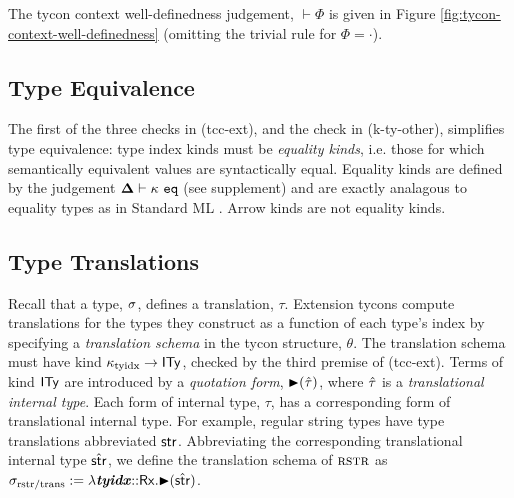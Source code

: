 \documentclass[preprint]{sigplanconf}
\begin{document}
\noindent The tycon context well-definedness judgement, $\vdash \Phi$ is given in Figure \ref{fig:tycon-context-well-definedness} (omitting the trivial rule for $\Phi=\cdot$). 



\subsection{Type Equivalence}\label{sec:type-equivalence}
\noindent The first of the three checks in (tcc-ext), and the check in (k-ty-other),  simplifies type equivalence: type index kinds must be \emph{equality kinds}, i.e. those for which semantically equivalent values are syntactically equal. Equality kinds are defined by the judgement $\boldsymbol\Delta \vdash \kappa~\mathtt{eq}$ (see supplement) and are exactly analagous to equality types as in Standard ML \cite{Tofte:89:TheDefinitionOfStandardML}. Arrow kinds are not equality kinds.

\subsection{Type Translations}\label{sec:type-translations}

\noindent 
Recall that a type, $\sigma$, defines a translation, $\tau$. Extension tycons {compute} translations for the types they construct as a function of each type's index by specifying a \emph{translation schema} in the {tycon structure}, $\theta$. The translation schema must have kind $\kappa_\text{tyidx} \rightarrow {\sf ITy}$, checked by the third premise of (tcc-ext). Terms of kind ${\sf ITy}$ are introduced by a \emph{quotation form}, ${\blacktriangleright}(\hat{\tau})$, where $\hat{\tau}$ is a \emph{translational internal type}. Each form of internal type, $\tau$,  has a corresponding form of translational internal type. For example, regular string types have type translations abbreviated ${\sf str}$. Abbreviating the corresponding translational internal type $\hat{{\sf str}}$, we define the translation schema of $\textsc{rstr}$ as $\sigma_\text{rstr/trans} := \lambda {\textbf{\textit{tyidx}}}{::}{\sf Rx}.{\blacktriangleright}(\hat{{\sf str}})$. 


\end{document}
